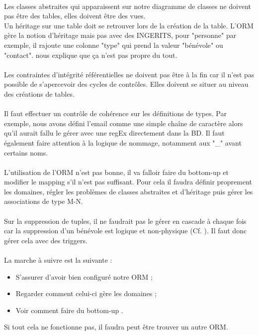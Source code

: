 \documentclass [a4paper] {article}
\begin{document}
\paragraph*{}
Les classes abstraites qui apparaissent sur notre diagramme de classes ne doivent pas être des tables, elles doivent être des vues. \\
Un héritage sur une table doit se retrouver lors de la création de la table. L'ORM gère la notion d'héritage mais pas avec des INGERITS, pour "personne" par exemple, il rajoute une colonne "type" qui prend la valeur "bénévole" ou "contact". \nomTuteurPedago{} nous explique que ça n'est pas propre du tout.
\paragraph*{}
Les contraintes d'intégrité référentielles ne doivent pas être à la fin car il n'est pas possible de s’apercevoir des cycles de contrôles. Elles doivent se situer au niveau des créations de tables.
\paragraph*{}
Il faut effectuer un contrôle de cohérence sur les définitions de types. Par exemple, nous avons défini l'email comme une simple chaîne de caractère alors qu'il aurait fallu le gérer avec une regEx directement dans la BD. Il faut également faire attention à la logique de nommage, notamment aux "_" avant certains noms.
\paragraph*{}
L'utilisation de l'ORM n'est pas bonne, il va falloir faire du bottom-up et modifier le mapping s'il n'est pas suffisant. Pour cela il faudra définir proprement les domaines, régler les problèmes de classes abstraites et d'héritage puis gérer les associations de type M-N.
\paragraph*{}
Sur la suppression de tuples, il ne faudrait pas le gérer en cascade à chaque fois car la suppression d'un bénévole est logique et non-physique (Cf. \CDC). Il faut donc gérer cela avec des triggers.
\paragraph*{}
La marche à suivre est la suivante :
\begin{itemize}
\item S'assurer d'avoir bien configuré notre ORM ;
\item Regarder comment celui-ci gère les domaines ;
\item Voir comment faire du bottom-up .
\end{itemize}
Si tout cela ne fonctionne pas, il faudra peut être trouver un autre ORM.






\newpage
\end{document}
